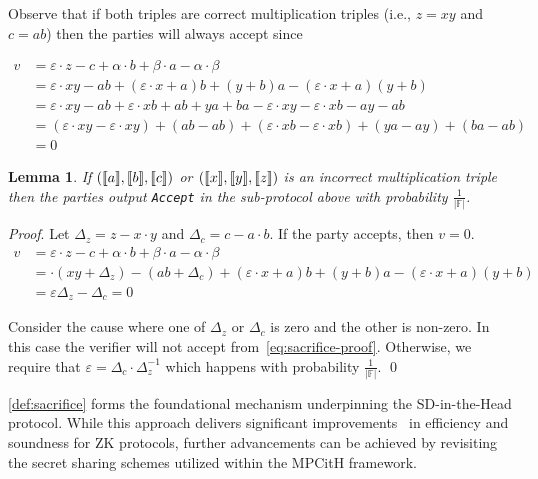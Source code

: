 \documentclass[11pt]{report}
\theoremstyle{definition}
\theoremstyle{plain}
\newtheorem{lemma}{Lemma}[section]
\begin{document}
Observe that if both triples are correct multiplication triples (i.e., $z = xy$ and $c = ab$) then the parties will always accept since

\begin{align*}
  v & = \varepsilon \cdot z - c + \alpha \cdot b + \beta \cdot a - \alpha \cdot \beta                                                     \\
    & = \varepsilon \cdot xy - ab + (\varepsilon \cdot x + a)b + (y + b)a - (\varepsilon \cdot x + a)(y + b)                              \\
    & = \varepsilon \cdot xy - ab + \varepsilon \cdot xb + ab + ya + ba - \varepsilon \cdot xy - \varepsilon \cdot xb - ay - ab           \\
    & = (\varepsilon \cdot xy - \varepsilon \cdot xy) + (ab - ab) + (\varepsilon \cdot xb - \varepsilon \cdot xb) + (ya - ay) + (ba - ab) \\
    & = 0
\end{align*}

\begin{lemma}\label{lem:sacrifice_soundness}
  If $(\llbracket a \rrbracket, \llbracket b \rrbracket, \llbracket c \rrbracket)$ or $(\llbracket x \rrbracket, \llbracket y \rrbracket, \llbracket z \rrbracket)$ is an incorrect multiplication triple then the parties output \texttt{Accept} in the sub-protocol above with probability $\frac{1}{|\mathbb{F}|}$.
\end{lemma}

\textit{Proof}. Let $\Delta_z = z - x \cdot y$ and $\Delta_c = c - a \cdot b$. If the party accepts, then $v = 0$.
\begin{align}
  v & = \varepsilon \cdot z - c + \alpha \cdot b + \beta \cdot a - \alpha \cdot \beta                           \nonumber             \\
    & = \cdot (xy + \Delta_z ) - (ab + \Delta_c) + (\varepsilon \cdot x + a)b + (y + b)a - (\varepsilon \cdot x + a)(y + b) \nonumber \\
    & = \varepsilon\Delta_z - \Delta_c = 0 \label{eq:sacrifice-proof}
\end{align}

Consider the cause where one of $\Delta_z$ or $\Delta_c$ is zero and the other is non-zero. In this case the verifier will not accept from~\ref{eq:sacrifice-proof}. Otherwise, we require that $\varepsilon = \Delta_c \cdot \Delta_z^{-1}$ which happens with probability $\frac{1}{|\mathbb{F}|}$. \qed

\autoref{def:sacrifice} forms the foundational mechanism underpinning the SD-in-the-Head protocol. While this approach delivers significant improvements~\cite{baum2020concretely,feneuil2022syndrome} in efficiency and soundness for ZK protocols, further advancements can be achieved by revisiting the secret sharing schemes utilized within the MPCitH framework.
\end{document}
